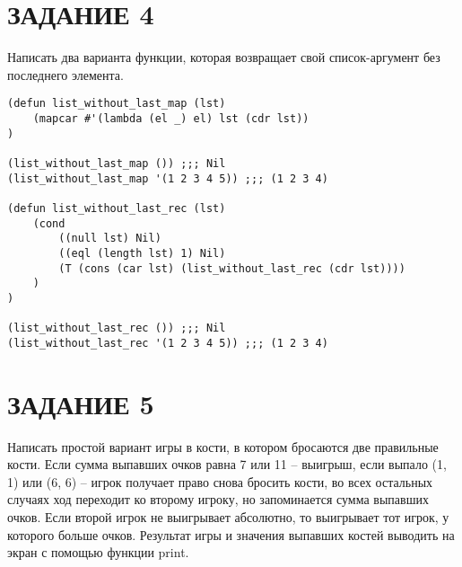 \section{ЗАДАНИЕ 4}

Написать два варианта функции, которая возвращает свой список-аргумент без
последнего элемента.

\begin{lstlisting}
(defun list_without_last_map (lst)
    (mapcar #'(lambda (el _) el) lst (cdr lst))
)

(list_without_last_map ()) ;;; Nil
(list_without_last_map '(1 2 3 4 5)) ;;; (1 2 3 4)

(defun list_without_last_rec (lst)
    (cond
        ((null lst) Nil)
        ((eql (length lst) 1) Nil)
        (T (cons (car lst) (list_without_last_rec (cdr lst))))
    )
)

(list_without_last_rec ()) ;;; Nil
(list_without_last_rec '(1 2 3 4 5)) ;;; (1 2 3 4)
\end{lstlisting}

\section{ЗАДАНИЕ 5}

Написать простой вариант игры в кости, в котором бросаются две правильные
кости. Если сумма выпавших очков равна 7 или 11 -- выигрыш, если выпало
(1, 1) или (6, 6) -- игрок получает право снова бросить кости, во всех остальных
случаях ход переходит ко второму игроку, но запоминается сумма выпавших
очков. Если второй игрок не выигрывает абсолютно, то выигрывает тот игрок,
у которого больше очков. Результат игры и значения выпавших костей выводить
на экран с помощью функции print.

